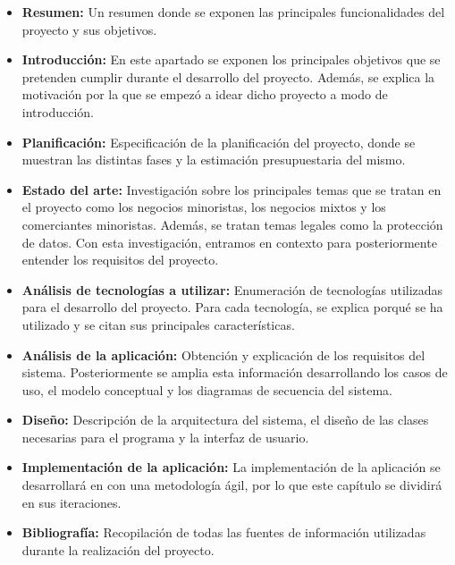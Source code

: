 \begin{itemize}
	\item \textbf{Resumen:} Un resumen donde se exponen las principales funcionalidades del proyecto y sus objetivos. 
	
	\item \textbf{Introducción:} En este apartado se exponen los principales objetivos que se pretenden cumplir durante el desarrollo del proyecto. Además, se explica la motivación por la que se empezó a idear dicho proyecto a modo de introducción. 

	
	\item \textbf{Planificación:} Especificación de la planificación del proyecto, donde se muestran las distintas fases y la estimación presupuestaria del mismo. 
	
	\item \textbf{Estado del arte:} Investigación sobre los principales temas que se tratan en el proyecto como los negocios minoristas, los negocios mixtos y los comerciantes minoristas. Además, se tratan temas legales como la protección de datos. Con esta investigación, entramos en contexto para posteriormente entender los requisitos del proyecto. 
	
	\item \textbf{Análisis de tecnologías a utilizar:} Enumeración de tecnologías utilizadas para el desarrollo del proyecto. Para cada tecnología, se explica porqué se ha utilizado y se citan sus principales características. 
	
	\item \textbf{Análisis de la aplicación:} Obtención y explicación de los requisitos del sistema. Posteriormente se amplia esta información desarrollando los casos de uso, el modelo conceptual y los diagramas de secuencia del sistema. 
	
	\item \textbf{Diseño:} Descripción de la arquitectura del sistema, el diseño de las clases necesarias para el programa y la interfaz de usuario.
	
	\item \textbf{Implementación de la aplicación:} La implementación de la aplicación se desarrollará en con una metodología ágil, por lo que este capítulo se dividirá en sus iteraciones. 
	
	\item \textbf{Bibliografía:} Recopilación de todas las fuentes de información utilizadas durante la realización del proyecto.
\end{itemize}
\newpage





